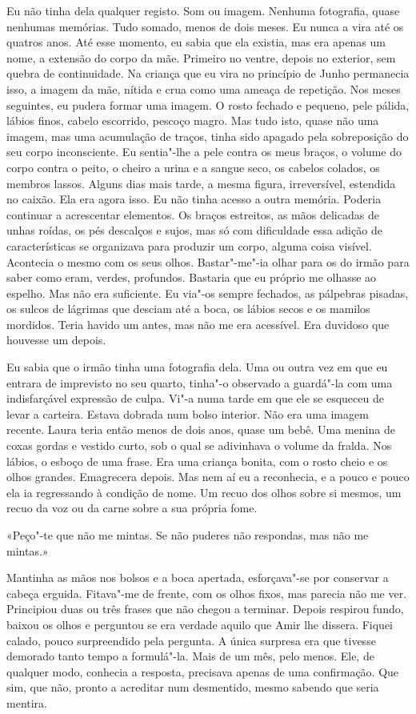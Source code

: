 Eu não tinha dela qualquer registo. Som ou imagem. Nenhuma fotografia,
quase nenhumas memórias. Tudo somado, menos de dois meses. Eu nunca a
vira até os quatros anos. Até esse momento, eu sabia que ela existia,
mas era apenas um nome, a extensão do corpo da mãe. Primeiro no ventre,
depois no exterior, sem quebra de continuidade. Na criança que eu vira
no princípio de Junho permanecia isso, a imagem da mãe, nítida e crua
como uma ameaça de repetição. Nos meses seguintes, eu pudera formar uma
imagem. O rosto fechado e pequeno, pele pálida, lábios finos, cabelo
escorrido, pescoço magro. Mas tudo isto, quase não uma imagem, mas uma
acumulação de traços, tinha sido apagado pela sobreposição do seu corpo
inconsciente. Eu sentia"-lhe a pele contra os meus braços, o volume do
corpo contra o peito, o cheiro a urina e a sangue seco, os cabelos
colados, os membros lassos. Alguns dias mais tarde, a mesma figura,
irreversível, estendida no caixão. Ela era agora isso. Eu não tinha
acesso a outra memória. Poderia continuar a acrescentar elementos. Os
braços estreitos, as mãos delicadas de unhas roídas, os pés descalços e
sujos, mas só com dificuldade essa adição de características se
organizava para produzir um corpo, alguma coisa visível. Acontecia o
mesmo com os seus olhos. Bastar"-me"-ia olhar para os do irmão para
saber como eram, verdes, profundos. Bastaria que eu próprio me olhasse
ao espelho. Mas não era suficiente. Eu via"-os sempre fechados, as
pálpebras pisadas, os sulcos de lágrimas que desciam até a boca, os
lábios secos e os mamilos mordidos. Teria havido um antes, mas não me
era acessível. Era duvidoso que houvesse um depois.

Eu sabia que o irmão tinha uma fotografia dela. Uma ou outra vez em que
eu entrara de imprevisto no seu quarto, tinha"-o observado a guardá"-la
com uma indisfarçável expressão de culpa. Vi"-a numa tarde em que ele se
esqueceu de levar a carteira. Estava dobrada num bolso interior. Não era
uma imagem recente. Laura teria então menos de dois anos, quase um bebê.
Uma menina de coxas gordas e vestido curto, sob o qual se adivinhava o
volume da fralda. Nos lábios, o esboço de uma frase. Era uma criança
bonita, com o rosto cheio e os olhos grandes. Emagrecera depois. Mas nem
aí eu a reconhecia, e a pouco e pouco ela ia regressando à condição de
nome. Um recuo dos olhos sobre si mesmos, um recuo da voz ou da carne
sobre a sua própria fome.

«Peço"-te que não me mintas. Se não puderes não respondas, mas não me
mintas.»

Mantinha as mãos nos bolsos e a boca apertada, esforçava"-se por
conservar a cabeça erguida. Fitava"-me de frente, com os olhos fixos,
mas parecia não me ver. Principiou duas ou três frases que não chegou a
terminar. Depois respirou fundo, baixou os olhos e perguntou se era
verdade aquilo que Amir lhe dissera. Fiquei calado, pouco surpreendido
pela pergunta. A única surpresa era que tivesse demorado tanto tempo a
formulá"-la. Mais de um mês, pelo menos. Ele, de qualquer modo, conhecia
a resposta, precisava apenas de uma confirmação. Que sim, que não,
pronto a acreditar num desmentido, mesmo sabendo que seria mentira.

